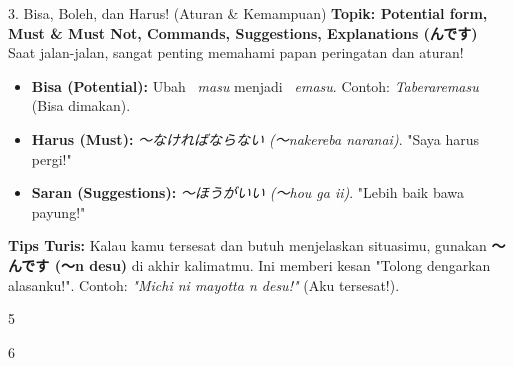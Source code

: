 \begin{lessonbox}{3. Bisa, Boleh, dan Harus! (Aturan \& Kemampuan)}
    \textbf{Topik: Potential form, Must \& Must Not, Commands, Suggestions, Explanations (んです)} \\
    Saat jalan-jalan, sangat penting memahami papan peringatan dan aturan!
    \begin{itemize}
        \item \textbf{Bisa (Potential):} Ubah \textit{~masu} menjadi \textit{~emasu}. Contoh: \textit{Taberaremasu} (Bisa dimakan).
        \item \textbf{Harus (Must):} \textit{〜なければならない (〜nakereba naranai)}. "Saya harus pergi!"
        \item \textbf{Saran (Suggestions):} \textit{〜ほうがいい (〜hou ga ii)}. "Lebih baik bawa payung!"
    \end{itemize}
    \textbf{Tips Turis:} Kalau kamu tersesat dan butuh menjelaskan situasimu, gunakan \textbf{〜んです (〜n desu)} di akhir kalimatmu. Ini memberi kesan "Tolong dengarkan alasanku!". Contoh: \textit{"Michi ni mayotta n desu!"} (Aku tersesat!).
\end{lessonbox}

\begin{convobox}{5}
    \noindent
      

    \vspace{1.5em}
\end{convobox}

\begin{convobox}{6}
    \noindent
      

    \vspace{1.5em}
\end{convobox}

